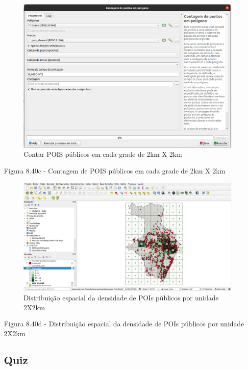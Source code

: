 \documentclass[
]{krantz}
\begin{document}
\begin{figure}
\centering
\includegraphics{media/modulo8/fig840_c.png}
\caption{Contar POIS públicos em cada grade de 2km X 2km}
\end{figure}

Figura 8.40c - Contagem de POIS públicos em cada grade de 2km X 2km

\begin{figure}
\centering
\includegraphics{media/modulo8/fig840_d.png}
\caption{Distribuição espacial da densidade de POIs públicos por unidade 2X2km}
\end{figure}

Figura 8.40d - Distribuição espacial da densidade de POIs públicos por unidade 2X2km

\hypertarget{quiz-19}{%
\subsection{Quiz}\label{quiz-19}}
\end{document}
